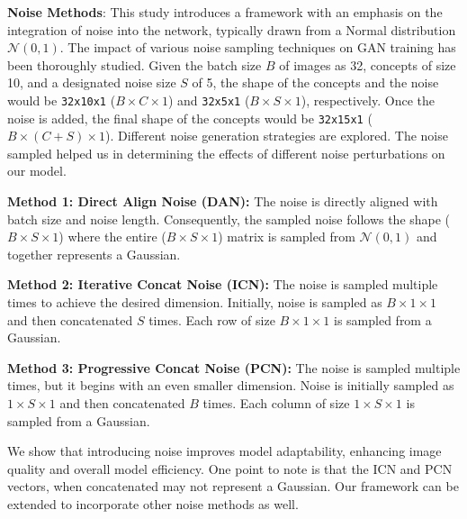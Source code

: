 \documentclass[letterpaper]{article}
\begin{document}
\textbf{Noise Methods}: This study introduces a framework with an emphasis on the integration of noise into the network, typically drawn from a Normal distribution $\mathcal{N}(0,1)$. The impact of various noise sampling techniques on GAN training has been thoroughly studied. Given the batch size $B$ of images as 32, concepts of size 10, and a designated noise size $S$ of 5, the shape of the concepts and the noise would be \texttt{32x10x1} (\(B \times C \times 1\)) and \texttt{32x5x1} (\(B \times S \times 1\)), respectively. Once the noise is added, the final shape of the concepts would be \texttt{32x15x1} (\(B \times (C+S) \times 1\)). Different noise generation strategies are explored. The noise sampled helped us in determining the effects of different noise perturbations on our model.

\textbf{Method 1: Direct Align Noise (DAN):} The noise is directly aligned with batch size and noise length. Consequently, the sampled noise follows the shape (\(B \times S \times 1\)) where the entire (\(B \times S \times 1\)) matrix is sampled from $\mathcal{N}(0,1)$ and together represents a Gaussian.

\textbf{Method 2: Iterative Concat Noise (ICN):} The noise is sampled multiple times to achieve the desired dimension. Initially, noise is sampled as \(B \times 1 \times 1\) and then concatenated \(S\) times. Each row of size \(B \times 1 \times 1\) is sampled from a Gaussian.

\textbf{Method 3: Progressive Concat Noise (PCN):} The noise is sampled multiple times, but it begins with an even smaller dimension. Noise is initially sampled as \(1 \times S \times 1\) and then concatenated \(B\) times. Each column of size \(1 \times S \times 1\) is sampled from a Gaussian.


We show that introducing noise improves model adaptability, enhancing image quality and overall model efficiency.
One point to note is that the ICN and PCN vectors, when concatenated may not represent a Gaussian. Our framework can be extended to incorporate other noise methods as well.
 
\end{document}
